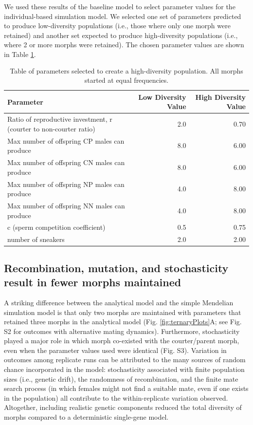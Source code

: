 \documentclass[
  11pt,
  a4paper,
]{article}
\begin{document}
We used these results of the baseline model to select parameter values
for the individual-based simulation model. We selected one set of
parameters predicted to produce low-diversity populations (i.e., those
where only one morph were retained) and another set expected to produce
high-diversity populations (i.e., where 2 or more morphs were retained).
The chosen parameter values are shown in Table
\ref{tab:SimParamsTable}.

\begin{table}[H]

\caption{\label{tab:SimParamsTable}Table of parameters selected to create a high-diversity population. All morphs started at equal frequencies.}
\centering
\begin{tabular}[t]{lrr}
\toprule
Parameter & Low Diversity Value & High Diversity Value\\
\midrule
Ratio of reproductive investment, r (courter to non-courter ratio) & 2.0 & 0.70\\
Max number of offspring CP males can produce & 8.0 & 6.00\\
Max number of offspring CN males can produce & 8.0 & 6.00\\
Max number of offspring NP males can produce & 4.0 & 8.00\\
Max number of offspring NN males can produce & 4.0 & 8.00\\
\addlinespace
c (sperm competition coefficient) & 0.5 & 0.75\\
number of sneakers & 2.0 & 2.00\\
\bottomrule
\end{tabular}
\end{table}

\hypertarget{recombination-mutation-and-stochasticity-result-in-fewer-morphs-maintained}{%
\subsection{Recombination, mutation, and stochasticity result in fewer morphs maintained}\label{recombination-mutation-and-stochasticity-result-in-fewer-morphs-maintained}}

A striking difference between the analytical model and the simple
Mendelian simulation model is that only two morphs are maintained with
parameters that retained three morphs in the analytical model (Fig.
\ref{fig:ternaryPlots}A; see Fig. S2 for outcomes with alternative
mating dynamics). Furthermore, stochasticity played a major role in
which morph co-existed with the courter/parent morph, even when the
parameter values used were identical (Fig. S3). Variation in outcomes
among replicate runs can be attributed to the many sources of random
chance incorporated in the model: stochasticity associated with finite
population sizes (i.e., genetic drift), the randomness of recombination,
and the finite mate search process (in which females might not find a
suitable mate, even if one exists in the population) all contribute to
the within-replicate variation observed. Altogether, including realistic
genetic components reduced the total diversity of morphs compared to a
deterministic single-gene model.
\end{document}
